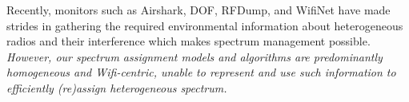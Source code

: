 Recently, monitors such as Airshark, DOF, RFDump, and WifiNet \cite{airshark,dof,rfdump,wifinet} have made strides in gathering the required environmental information about heterogeneous radios and their interference which makes spectrum management possible.  \emph{However, our spectrum assignment models and algorithms are predominantly homogeneous and Wifi-centric, unable to represent and use such information to efficiently (re)assign heterogeneous spectrum.}  



%


%
%
%
%
%


